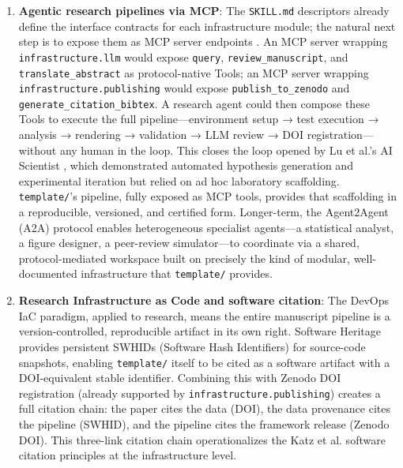 \documentclass[
]{article}
\begin{document}
\begin{enumerate}
  algorithmic logic and that \texttt{src/} modules do not import from
  \texttt{scripts/}.
\item
  \textbf{Agentic research pipelines via MCP}: The \texttt{SKILL.md}
  descriptors already define the interface contracts for each
  infrastructure module; the natural next step is to expose them as MCP
  server endpoints \citep{anthropic2024mcp}. An MCP server wrapping
  \texttt{infrastructure.llm} would expose \texttt{query},
  \texttt{review\_manuscript}, and \texttt{translate\_abstract} as
  protocol-native Tools; an MCP server wrapping
  \texttt{infrastructure.publishing} would expose
  \texttt{publish\_to\_zenodo} and \texttt{generate\_citation\_bibtex}.
  A research agent could then compose these Tools to execute the full
  pipeline---environment setup → test execution → analysis → rendering →
  validation → LLM review → DOI registration---without any human in the
  loop. This closes the loop opened by Lu et al.'s AI Scientist
  \citep{lu2024aiscientist}, which demonstrated automated hypothesis
  generation and experimental iteration but relied on ad hoc laboratory
  scaffolding. \texttt{template/}'s pipeline, fully exposed as MCP
  tools, provides that scaffolding in a reproducible, versioned, and
  certified form. Longer-term, the Agent2Agent (A2A) protocol
  \citep{google2025a2a} enables heterogeneous specialist agents---a
  statistical analyst, a figure designer, a peer-review simulator---to
  coordinate via a shared, protocol-mediated workspace built on
  precisely the kind of modular, well-documented infrastructure that
  \texttt{template/} provides.
\item
  \textbf{Research Infrastructure as Code and software citation}: The
  DevOps IaC paradigm, applied to research, means the entire manuscript
  pipeline is a version-controlled, reproducible artifact in its own
  right. Software Heritage \citep{cosmo2020softwareheritage} provides
  persistent SWHIDs (Software Hash Identifiers) for source-code
  snapshots, enabling \texttt{template/} itself to be cited as a
  software artifact with a DOI-equivalent stable identifier. Combining
  this with Zenodo DOI registration (already supported by
  \texttt{infrastructure.publishing}) creates a full citation chain: the
  paper cites the data (DOI), the data provenance cites the pipeline
  (SWHID), and the pipeline cites the framework release (Zenodo DOI).
  This three-link citation chain operationalizes the Katz et al.
  \citep{katz2021software} software citation principles at the
  infrastructure level.
\end{enumerate}
\end{document}
